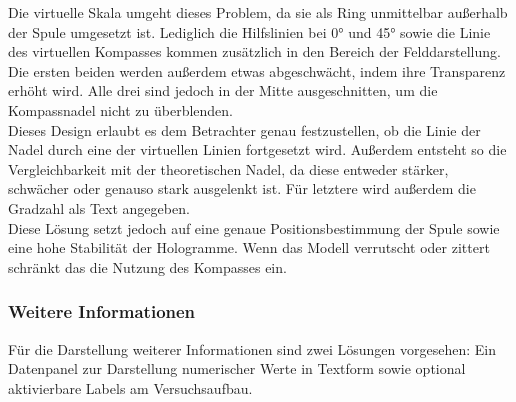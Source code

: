 Die virtuelle Skala umgeht dieses Problem, da sie als Ring unmittelbar außerhalb der Spule umgesetzt ist. Lediglich die Hilfslinien bei 0° und 45° sowie die Linie des virtuellen Kompasses kommen zusätzlich in den Bereich der Felddarstellung. Die ersten beiden werden außerdem etwas abgeschwächt, indem ihre Transparenz erhöht wird. Alle drei sind jedoch in der Mitte ausgeschnitten, um die Kompassnadel nicht zu überblenden.\\

Dieses Design erlaubt es dem Betrachter genau festzustellen, ob die Linie der Nadel durch eine der virtuellen Linien fortgesetzt wird. Außerdem entsteht so die Vergleichbarkeit mit der theoretischen Nadel, da diese entweder stärker, schwächer oder genauso stark ausgelenkt ist. Für letztere wird außerdem die Gradzahl als Text angegeben.\\

Diese Lösung setzt jedoch auf eine genaue Positionsbestimmung der Spule sowie eine hohe Stabilität der Hologramme. Wenn das Modell verrutscht oder zittert schränkt das die Nutzung des Kompasses ein.

\subsubsection{Weitere Informationen} 
\label{sec-4-2-5}
Für die Darstellung weiterer Informationen sind zwei Lösungen vorgesehen: Ein Datenpanel zur Darstellung numerischer Werte in Textform sowie optional aktivierbare Labels am Versuchsaufbau.

